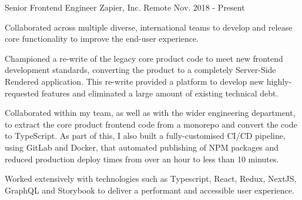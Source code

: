 

\begin{cventries}

  \cventry
    {Senior Frontend Engineer} %
    {Zapier, Inc.} %
    {Remote} %
    {Nov. 2018 - Present} %
    {
      \begin{cvitems} %
        \item {
          Collaborated across multiple diverse, international teams to develop and release core functionality to improve
          the end-user experience.
        }
        \item {
          Championed a re-write of the legacy core product code to meet new frontend development standards, converting
          the product to a completely Server-Side Rendered application. This re-write provided a platform to develop
          new highly-requested features and eliminated a large amount of existing technical debt.
        }
        \item {
          Collaborated within my team, as well as with the wider engineering department, to extract the core product
          frontend code from a monorepo and convert the code to TypeScript. As part of this, I also built a
          fully-customised CI/CD pipeline, using GitLab and Docker, that automated publishing of NPM packages and
          reduced production deploy times from over an hour to less than 10 minutes.
        }
        \item {
          Worked extensively with technologies such as Typescript, React, Redux, NextJS, GraphQL and Storybook to
          deliver a performant and accessible user experience.
        }
      \end{cvitems}
    }


\end{cventries}
